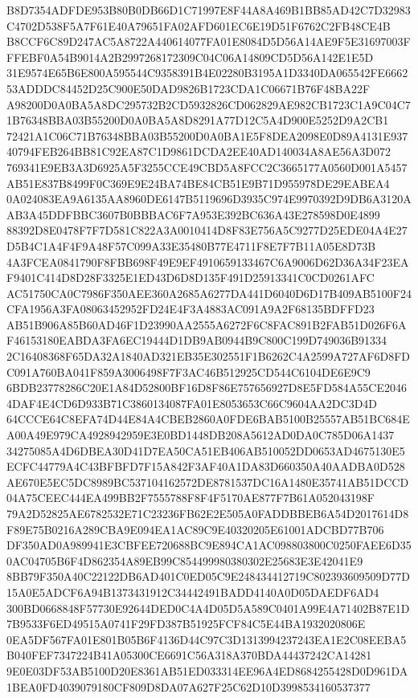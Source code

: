 \documentclass[UTF8,fontset=fandol,zihao=-4,a4paper]{ctexart}
\begin{document}
{{B8D7354ADFDE953B80B0DB66D1C71997E8F44A8A469B1BB85AD42C7D32983C4702D538F5A7F61E40A79651FA02AFD601EC6E19D51F6762C2FB48CE4B
B8CCF6C89D247AC5A8722A440614077FA01E8084D5D56A14AE9F5E31697003FFFEBF0A54B9014A2B2997268172309C04C06A14809CD5D56A142E1E5D
31E9574E65B6E800A595544C9358391B4E02280B3195A1D3340DA065542FE666253ADDDC84452D25C900E50DAD9826B1723CDA1C06671B76F48BA22F
A98200D0A0BA5A8DC295732B2CD5932826CD062829AE982CB1723C1A9C04C71B76348BBA03B55200D0A0BA5A8D8291A77D12C5A4D900E5252D9A2CB1
72421A1C06C71B76348BBA03B55200D0A0BA1E5F8DEA2098E0D89A4131E93740794FEB264BB81C92EA87C1D9861DCDA2EE40AD140034A8AE56A3D072
769341E9EB3A3D6925A5F3255CCE49CBD5A8FCC2C3665177A0560D001A5457AB51E837B8499F0C369E9E24BA74BE84CB51E9B71D955978DE29EABEA4
0A024083EA9A6135AA8960DE6147B5119696D3935C974E9970392D9DB6A3120AAB3A45DDFBBC3607B0BBBAC6F7A953E392BC636A43E278598D0E4899
88392D8E0478F7F7D581C822A3A0010414D8F83E756A5C9277D25EDE04A4E27D5B4C1A4F4F9A48F57C099A33E35480B77E4711F8E7F7B11A05E8D73B
4A3FCEA0841790F8FBB698F49E9EF4910659133467C6A9006D62D36A34F23EAF9401C414D8D28F3325E1ED43D6D8D135F491D25913341C0CD0261AFC
AC51750CA0C7986F350AEE360A2685A6277DA441D6040D6D17B409AB5100F24CFA1956A3FA08063452952FD24E4F3A4883AC091A9A2F68135BDFFD23
AB51B906A85B60AD46F1D23990AA2555A6272F6C8FAC891B2FAB51D026F6AF46153180EABDA3FA6EC19444D1DB9AB0944B9C800C199D749036B91334
2C16408368F65DA32A1840AD321EB35E302551F1B6262C4A2599A727AF6D8FDC091A760BA041F859A3006498F7F3AC46B512925CD544C6104DE6E9C9
6BDB23778286C20E1A84D52800BF16D8F86E757656927D8E5FD584A55CE20464DAF4E4CD6D933B71C3860134087FA01E8053653C66C9604AA2DC3D4D
64CCCE64C8EFA74D44E84A4CBEB2860A0FDE6BAB5100B25557AB51BC684EA00A49E979CA4928942959E3E0BD1448DB208A5612AD0DA0C785D06A1437
34275085A4D6DBEA30D41D7EA50CA51EB406AB510052DD0653AD4675130E5ECFC44779A4C43BFBFD7F15A842F3AF40A1DA83D660350A40AADBA0D528
AE670E5EC5DC8989BC537104162572DE8781537DC16A1480E35741AB51DCCD04A75CEEC444EA499BB2F7555788F8F4F5170AE877F7B61A052043198F
79A2D52825AE6782532E71C23236FB62E2E505A0FADDBBEB6A54D2017614D8F89E75B0216A289CBA9E094EA1AC89C9E40320205E61001ADCBD77B706
DF350AD0A989941E3CBFEE720688BC9E894CA1AC098803800C0250FAEE6D350AC04705B6F4D862354A89EB99C854499980380302E25683E3E42041E9
8BB79F350A40C22122DB6AD401C0ED05C9E248434412719C802393609509D77D15A0E5ADCF6A94B1373431912C34442491BADD4140A0D05DAEDF6AD4
300BD0668848F57730E92644DED0C4A4D05D5A589C0401A99E4A71402B87E1D7B9533F6ED49515A0741F29FD387B51925FCF84C5E44BA1932020806E
0EA5DF567FA01E801B05B6F4136D44C97C3D1313994237243EA1E2C08EEBA5B040FEF7347224B41A05300CE6691C56A318A370BDA44437242CA14281
9E0E03DF53AB5100D20E8361AB51ED033314EE96A4ED8684255428D0D961DA1BEA0FD4039079180CF809D8DA07A627F25C62D10D3998534160537377
}}
\end{document}
